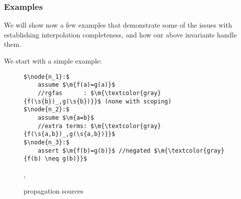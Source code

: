 %
%

\subsubsection{Examples}
We will show now a few examples that demonstrate some of the issues with establishing interpolation completeness, and how our above invariants handle them.

\noindent
We start with a simple example:
\begin{figure}[H]
\begin{lstlisting}
$\node{n_1}:$
	assume $\m{f(a)=g(a)}$
	//rgfas      : $\m{\textcolor{gray}{f(\s{b})_,g(\s{b})}}$ (none with scoping)
$\node{n_2}:$
	assume $\m{a=b}$
	//extra terms: $\m{\textcolor{gray}{f(\s{a,b})_,g(\s{a,b})}}$
$\node{n_3}:$
	assert $\m{f(b)=g(b)}$ //negated $\m{\textcolor{gray}{f(b) \neq g(b)}}$
\end{lstlisting}
\caption{propagation sources},
\label{snippet3.16a}
\end{figure}

